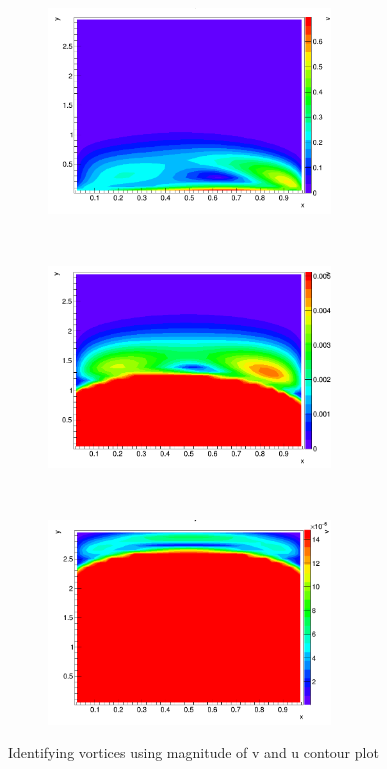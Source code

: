 \documentclass[paper=a4, fontsize=11pt, abstract=on]{scrartcl}
\numberwithin{equation}{section}		%
\numberwithin{figure}{section}			%
\numberwithin{table}{section}				%
\begin{document}
\begin{figure}[H]
        \centering
        \begin{subfigure}[h]{0.5\textwidth}
        \centering
                \includegraphics[width = 7.5cm]{v1}
                \caption{}				
        \end{subfigure}%
       ~~~~~
        \begin{subfigure}[h]{0.5\textwidth}
        \centering
                \includegraphics[width = 7.5cm]{v2}
                \caption{}               
        \end{subfigure}       
         ~~~~~
        \begin{subfigure}[h]{0.5\textwidth}
        \centering
                \includegraphics[width = 7.5cm]{v3}
                \caption{}               
        \end{subfigure}
        \caption{Identifying vortices using magnitude of v and u contour plot}
        \label{v1}
\end{figure}
\end{document}
